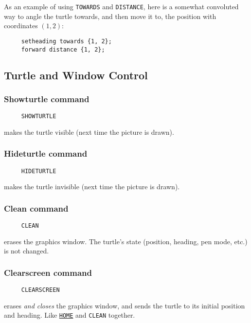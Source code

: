 As an example of using \texttt{TOWARDS} and \texttt{DISTANCE}, here is
a somewhat convoluted way to angle the turtle towards, and then move
it to, the position with coordinates $(1,2)$:
\begin{verbatim}
     setheading towards {1, 2};
     forward distance {1, 2};
\end{verbatim}


\subsection{Turtle and Window Control}
\label{logoturtle:TWC}

\hypertarget{logoturtle:showturtle}{\subsubsection*{Showturtle command}}
\begin{verbatim}
     SHOWTURTLE
\end{verbatim}
makes the turtle visible (next time the picture is drawn).

\hypertarget{logoturtle:hideturtle}{\subsubsection*{Hideturtle command}}
\begin{verbatim}
     HIDETURTLE
\end{verbatim}
makes the turtle invisible (next time the picture is drawn).

\subsubsection*{Clean command}
\begin{verbatim}
     CLEAN
\end{verbatim}
erases the graphics window.  The turtle's state (position, heading,
pen mode, etc.) is not changed.

\subsubsection*{Clearscreen command}
\begin{verbatim}
     CLEARSCREEN
\end{verbatim}
erases \emph{and closes} the graphics window, and sends the turtle to
its initial position and heading.  Like
\texttt{\hyperlink{logoturtle:home}{HOME}} and \texttt{CLEAN}
together.

